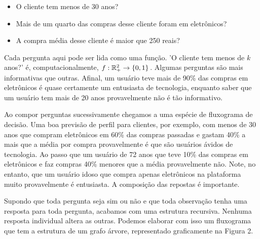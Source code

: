 \begin{itemize}
    \item O cliente tem menos de 30 anos?
    \item Mais de um quarto das compras desse cliente foram em eletrônicos?
    \item A compra média desse cliente é maior que 250 reais?
\end{itemize}

Cada pergunta aqui pode ser lida como uma função. 'O cliente tem menos de $k$ anos?' é, computacionalmente,  $f: \mathbb{R}^2_+ \to \{0, 1\}$. Algumas perguntas são mais informativas que outras. Afinal, um usuário teve mais de 90\% das compras em eletrônicos é quase certamente um entusiasta de tecnologia, enquanto saber que um usuário tem mais de 20 anos provavelmente não é tão informativo. 

Ao compor perguntas sucessivamente chegamos a uma espécie de fluxograma de decisão. Uma boa previsão de perfil para clientes, por exemplo, com menos de 30 anos que compram eletrônicos em 60\% das compras passadas e gastam 40\% a mais que a média por compra provavelmente é que são usuários ávidos de tecnologia. Ao passo que um usuário de 72 anos que teve 10\% das compras em eletrônicos e faz compras 40\% menores que a média provavelmente não. Note, no entanto, que um usuário idoso que compra apenas eletrônicos na plataforma muito provavelmente é entusiasta. A composição das repostas é importante.

Supondo que toda pergunta seja sim ou não e que toda observação tenha uma resposta para toda pergunta, acabamos com uma estrutura recursiva. Nenhuma resposta individual altera as outras. Podemos elaborar com isso um fluxograma que tem a estrutura de um grafo árvore, representado graficamente na Figura 2. 


\begin{figure}[H]
    \centering
        \label{fig:arvore}
\end{figure}

